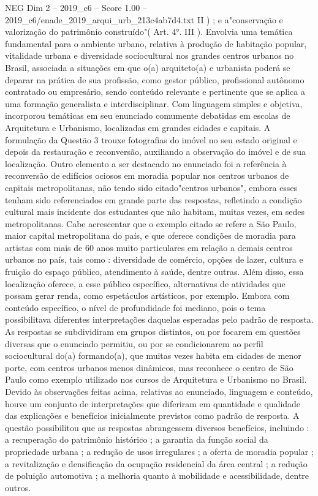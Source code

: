 \begin{textsample}{NEG Dim 2 – 2019\_c6 – Score 1.00 – 2019\_c6/enade\_2019\_arqui\_urb\_213c4ab7d4.txt}
II ) ; e a"conservação e valorização do patrimônio construído"( Art. 4{\EmojiFont °}.
III ).
Envolvia uma temática fundamental para o ambiente urbano, relativa à produção de habitação popular, vitalidade urbana e diversidade sociocultural nos grandes centros urbanos no Brasil, associada a situações em que o(a) arquiteto(a) e urbanista poderá se deparar na prática de sua profissão, como gestor público, profissional autônomo contratado ou empresário, sendo conteúdo relevante e pertinente que se aplica a uma formação generalista e interdisciplinar.
Com linguagem simples e objetiva, incorporou temáticas em seu enunciado comumente debatidas em escolas de Arquitetura e Urbanismo, localizadas em grandes cidades e capitais.
A formulação da Questão 3 trouxe fotografias do imóvel no seu estado original e depois da restauração e reconversão, auxiliando a observação do imóvel e de sua localização.
Outro elemento a ser destacado no enunciado foi a referência à reconversão de edifícios ociosos em moradia popular nos centros urbanos de capitais metropolitanas, não tendo sido citado"centros urbanos", embora esses tenham sido referenciados em grande parte das respostas, refletindo a condição cultural mais incidente dos estudantes que não habitam, muitas vezes, em sedes metropolitanas.
Cabe acrescentar que o exemplo citado se refere a São Paulo, maior capital metropolitana do país, e que oferece condições de moradia para artistas com mais de 60 anos muito particulares em relação a demais centros urbanos no país, tais como : diversidade de comércio, opções de lazer, cultura e fruição do espaço público, atendimento à saúde, dentre outras.
Além disso, essa localização oferece, a esse público específico, alternativas de atividades que possam gerar renda, como espetáculos artísticos, por exemplo.
Embora com conteúdo específico, o nível de profundidade foi mediano, pois o tema possibilitava diferentes interpretações daquelas esperadas pelo padrão de resposta.
As respostas se subdividiram em grupos distintos, ou por focarem em questões diversas que o enunciado permitiu, ou por se condicionarem ao perfil sociocultural do(a) formando(a), que muitas vezes habita em cidades de menor porte, com centros urbanos menos dinâmicos, mas reconhece o centro de São Paulo como exemplo utilizado nos cursos de Arquitetura e Urbanismo no Brasil.
Devido às observações feitas acima, relativas ao enunciado, linguagem e conteúdo, houve um conjunto de interpretações que diferiram em quantidade e qualidade das explicações e benefícios inicialmente previstos como padrão de resposta.
A questão possibilitou que as respostas abrangessem diversos benefícios, incluindo : a recuperação do patrimônio histórico ; a garantia da função social da propriedade urbana ; a redução de usos irregulares ; a oferta de moradia popular ; a revitalização e densificação da ocupação residencial da área central ; a redução de poluição automotiva ; a melhoria quanto à mobilidade e acessibilidade, dentre outros.

\end{textsample}
